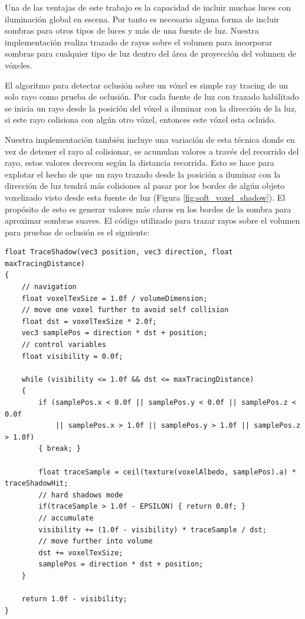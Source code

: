 Una de las ventajas de este trabajo es la capacidad de incluir muchas luces con iluminación global en escena. Por tanto es necesario alguna forma de incluir sombras para otros tipos de luces y más de una fuente de luz. Nuestra implementación realiza trazado de rayos sobre el volumen para incorporar sombras para cualquier tipo de luz dentro del área de proyección del volumen de vóxeles.

El algoritmo para detectar oclusión sobre un vóxel es simple ray tracing de un solo rayo como prueba de oclusión. Por cada fuente de luz con trazado habilitado se inicia un rayo desde la posición del vóxel a iluminar con la dirección de la luz, si este rayo colisiona con algún otro vóxel, entonces este vóxel esta ocluido.

Nuestra implementación también incluye una variación de esta técnica donde en vez de detener el rayo al colisionar, se acumulan valores a través del recorrido del rayo, estos valores decrecen según la distancia recorrida. Esto se hace para explotar el hecho de que un rayo trazado desde la posición a iluminar con la dirección de luz tendrá más colisiones al pasar por los bordes de algún objeto voxelizado visto desde esta fuente de luz (Figura \ref{fig:soft_voxel_shadow}). El propósito de esto es generar valores más claros en los bordes de la sombra para aproximar sombras suaves. El código utilizado para trazar rayos sobre el volumen para pruebas de oclusión es el siguiente:
\\
\begin{lstlisting}[caption={Trazado de rayos sobre volumen albedo para sombras sobre vóxeles}, label=Shadow1]
float TraceShadow(vec3 position, vec3 direction, float maxTracingDistance) 
{
    // navigation
    float voxelTexSize = 1.0f / volumeDimension;
    // move one voxel further to avoid self collision
    float dst = voxelTexSize * 2.0f;
    vec3 samplePos = direction * dst + position;
    // control variables
    float visibility = 0.0f;

    while (visibility <= 1.0f && dst <= maxTracingDistance) 
    {
        if (samplePos.x < 0.0f || samplePos.y < 0.0f || samplePos.z < 0.0f
            || samplePos.x > 1.0f || samplePos.y > 1.0f || samplePos.z > 1.0f) 
        { break; }
        
        float traceSample = ceil(texture(voxelAlbedo, samplePos).a) * traceShadowHit;
        // hard shadows mode
        if(traceSample > 1.0f - EPSILON) { return 0.0f; }
        // accumulate
        visibility += (1.0f - visibility) * traceSample / dst;
        // move further into volume
        dst += voxelTexSize;
        samplePos = direction * dst + position;
    }

    return 1.0f - visibility;
}
\end{lstlisting}

